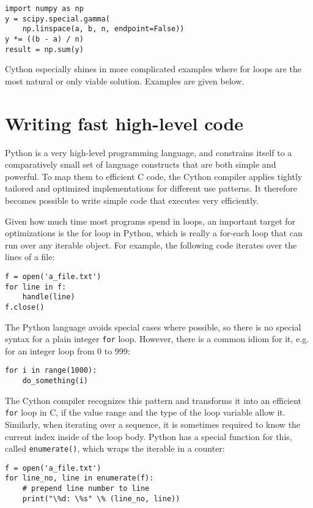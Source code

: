 \documentclass[letterpaper,11pt,english]{article}
\newcommand{\code}[1]{\texttt{#1}}
\begin{document}
\begin{verbatim}
import numpy as np
y = scipy.special.gamma(
    np.linspace(a, b, n, endpoint=False))
y *= ((b - a) / n)
result = np.sum(y)
\end{verbatim}


Cython especially shines in more complicated examples where for loops
are the most natural or only viable solution. Examples are
given below.


\section{Writing fast high-level code}

Python is a very high-level programming language, and constrains
itself to a comparatively small set of language constructs that are
both simple and powerful.  To map them to efficient C code, the Cython
compiler applies tightly tailored and optimized implementations for
different use patterns.  It therefore becomes possible to write simple
code that executes very efficiently.

Given how much time most programs spend in loops, an important target
for optimizations is the for loop in Python, which is really a
for-each loop that can run over any iterable object.  For example, the
following code iterates over the lines of a file:

\begin{verbatim}
f = open('a_file.txt')
for line in f:
    handle(line)
f.close()
\end{verbatim}

The Python language avoids special cases where possible, so there is
no special syntax for a plain integer \code{for} loop.  However, there is
a common idiom for it, e.g. for an integer loop from 0 to 999:

\begin{verbatim}
for i in range(1000):
    do_something(i)
\end{verbatim}

The Cython compiler recognizes this pattern and transforms it into an
efficient \code{for} loop in C, if the value range and the type of the loop
variable allow it.  Similarly, when iterating over a sequence, it is
sometimes required to know the current index inside of the loop body.
Python has a special function for this, called \code{enumerate()}, which
wraps the iterable in a counter:

\begin{verbatim}
f = open('a_file.txt')
for line_no, line in enumerate(f):
    # prepend line number to line
    print("\%d: \%s" \% (line_no, line))
\end{verbatim}
\end{document}
